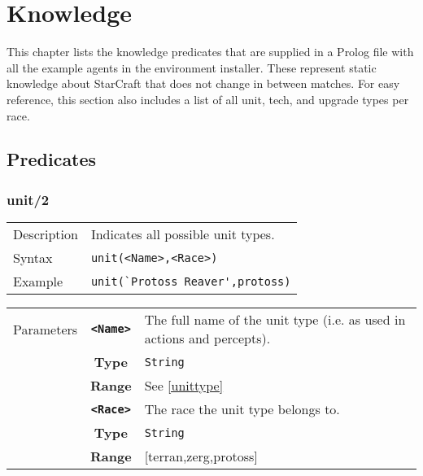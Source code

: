 \chapter{Knowledge}

This chapter lists the knowledge predicates that are supplied in a Prolog file with all the example agents in the environment installer. These represent static knowledge about StarCraft that does not change in between matches. For easy reference, this section also includes a list of all unit, tech, and upgrade types per race.

\section{Predicates}
\subsection{unit/2}
\begin{tabularx}{\textwidth}{lX}
 Description & Indicates all possible unit types. \\
 Syntax & \verb|unit(<Name>,<Race>)| \\
 Example & \verb|unit(`Protoss Reaver',protoss)| \\
 \end{tabularx}
 \begin{tabularx}{\textwidth}{l | c | p{8cm}|}
 \cline{2-3}
 Parameters & \textbf{\verb|<Name>|} & The full name of the unit type (i.e. as used in actions and percepts). \\
            & \textbf{Type} & \verb|String| \\
            & \textbf{Range} & See \ref{unittype} \\
            \cline{2-3}
 			& \textbf{\verb|<Race>|} & The race the unit type belongs to.\\
            & \textbf{Type} & \verb|String| \\
            & \textbf{Range} & [terran,zerg,protoss] \\
            \cline{2-3}
\end{tabularx}

